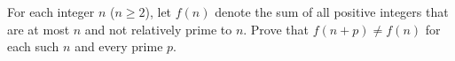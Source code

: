 For each integer $n$ ($n \ge 2$), let $f(n)$ denote the sum of all positive integers that are at most $n$ and not relatively prime to $n$.
Prove that $f(n+p) \neq f(n)$ for each such $n$ and every prime $p$.